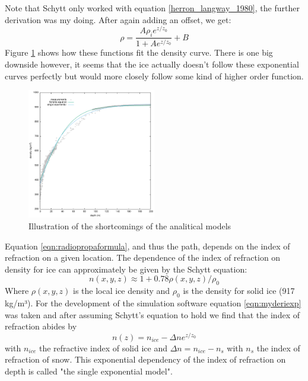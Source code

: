 \documentclass[11pt,a4paper,faculty=we,language=en,doctype=report]{cls/ugent-doc}
\begin{document}
Note that Schytt only worked with equation \ref{herron_langway_1980}, the
further derivation was my doing.  After again adding an offset, we get:
\begin{equation}
	\rho = \frac{A\rho_i e^{z/z_0}}{1 + Ae^{z/z_0}} + B
\end{equation}
Figure \ref{fig:DensityMeasurements} shows how these functions fit the density
curve.  There is one big downside however, it seems that the ice actually
doesn't follow these exponential curves perfectly but would more closely follow
some kind of higher order function.
\begin{figure}
  \centering
	\includegraphics[width=0.5\textwidth]{Density_measurements2.pdf}
	\caption{Illustration of the shortcomings of the analitical models}
	\label{fig:DensityMeasurements}
\end{figure}

Equation \ref{eqn:radiopropaformula}, and thus the path, depends on the index
of refraction on a given location.  The dependence of the index of refraction
on density for ice can approximately be given by the Schytt equation\cite{Barwick_2018}:
\begin{equation} 
	n(x,y,z) \approx 1 + 0.78\rho(x,y,z)/\rho_0 \label{eqn:Schytt}
\end{equation} 
Where $\rho(x,y,z)$ is the local ice density and $\rho_0$ is the
density for solid ice (917 kg/m³).  For the development of the simulation
software equation \ref{eqn:myderiexp} was taken and after assuming Schytt's
equation to hold we find that the index of refraction abides by
\begin{equation}
	\label{eqn:expn}
	n(z) = n_{ice} - \Delta n e^{z/z_0}
\end{equation}
with $n_{ice}$ the refractive index of solid ice and $\Delta n = n_{ice} - n_s$
with $n_s$ the index of refraction of snow. This exponential dependency of the
index of refraction on depth is called "the single exponential model".  
\end{document}
